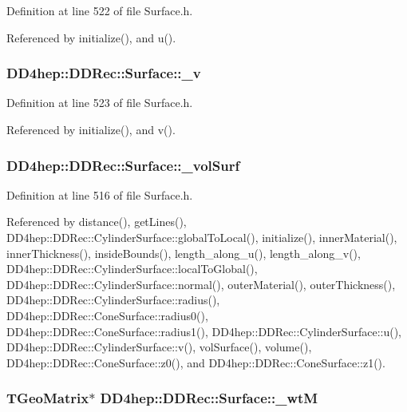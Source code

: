 Definition at line 522 of file Surface.h.

Referenced by initialize(), and u().\hypertarget{class_d_d4hep_1_1_d_d_rec_1_1_surface_a12656a8ed5ccc5a1993e1bacf9d4624b}{
\subsubsection[{\_\-v}]{ {\bf DD4hep::DDRec::Surface::\_\-v}}}
\label{class_d_d4hep_1_1_d_d_rec_1_1_surface_a12656a8ed5ccc5a1993e1bacf9d4624b}


Definition at line 523 of file Surface.h.

Referenced by initialize(), and v().\hypertarget{class_d_d4hep_1_1_d_d_rec_1_1_surface_a5555dbcfaaa833c3169aec39f447b2c3}{
\subsubsection[{\_\-volSurf}]{ {\bf DD4hep::DDRec::Surface::\_\-volSurf}}}
\label{class_d_d4hep_1_1_d_d_rec_1_1_surface_a5555dbcfaaa833c3169aec39f447b2c3}


Definition at line 516 of file Surface.h.

Referenced by distance(), getLines(), DD4hep::DDRec::CylinderSurface::globalToLocal(), initialize(), innerMaterial(), innerThickness(), insideBounds(), length\_\-along\_\-u(), length\_\-along\_\-v(), DD4hep::DDRec::CylinderSurface::localToGlobal(), DD4hep::DDRec::CylinderSurface::normal(), outerMaterial(), outerThickness(), DD4hep::DDRec::CylinderSurface::radius(), DD4hep::DDRec::ConeSurface::radius0(), DD4hep::DDRec::ConeSurface::radius1(), DD4hep::DDRec::CylinderSurface::u(), DD4hep::DDRec::CylinderSurface::v(), volSurface(), volume(), DD4hep::DDRec::ConeSurface::z0(), and DD4hep::DDRec::ConeSurface::z1().\hypertarget{class_d_d4hep_1_1_d_d_rec_1_1_surface_acbbdd616ea4e084228084cd6d94dff99}{
\subsubsection[{\_\-wtM}]{\setlength{\rightskip}{0pt plus 5cm}TGeoMatrix$\ast$ {\bf DD4hep::DDRec::Surface::\_\-wtM}}}
\label{class_d_d4hep_1_1_d_d_rec_1_1_surface_acbbdd616ea4e084228084cd6d94dff99}


